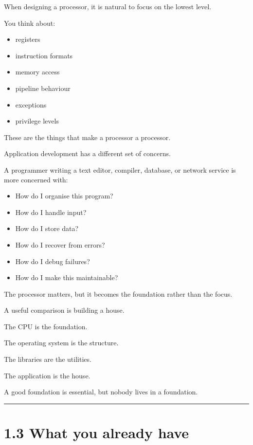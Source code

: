\documentclass[
  oneside,
  openany]{book}
\providecommand{\tightlist}{%
  \setlength{\itemsep}{0pt}\setlength{\parskip}{0pt}}
\begin{document}
When designing a processor, it is natural to focus on the lowest level.

You think about:

\begin{itemize}
\tightlist
\item
  registers
\item
  instruction formats
\item
  memory access
\item
  pipeline behaviour
\item
  exceptions
\item
  privilege levels
\end{itemize}

These are the things that make a processor a processor.

Application development has a different set of concerns.

A programmer writing a text editor, compiler, database, or network
service is more concerned with:

\begin{itemize}
\tightlist
\item
  How do I organise this program?
\item
  How do I handle input?
\item
  How do I store data?
\item
  How do I recover from errors?
\item
  How do I debug failures?
\item
  How do I make this maintainable?
\end{itemize}

The processor matters, but it becomes the foundation rather than the
focus.

A useful comparison is building a house.

The CPU is the foundation.

The operating system is the structure.

The libraries are the utilities.

The application is the house.

A good foundation is essential, but nobody lives in a foundation.

\begin{center}\rule{0.5\linewidth}{0.5pt}\end{center}

\hypertarget{what-you-already-have}{%
\section{1.3 What you already have}\label{what-you-already-have}}
\end{document}
